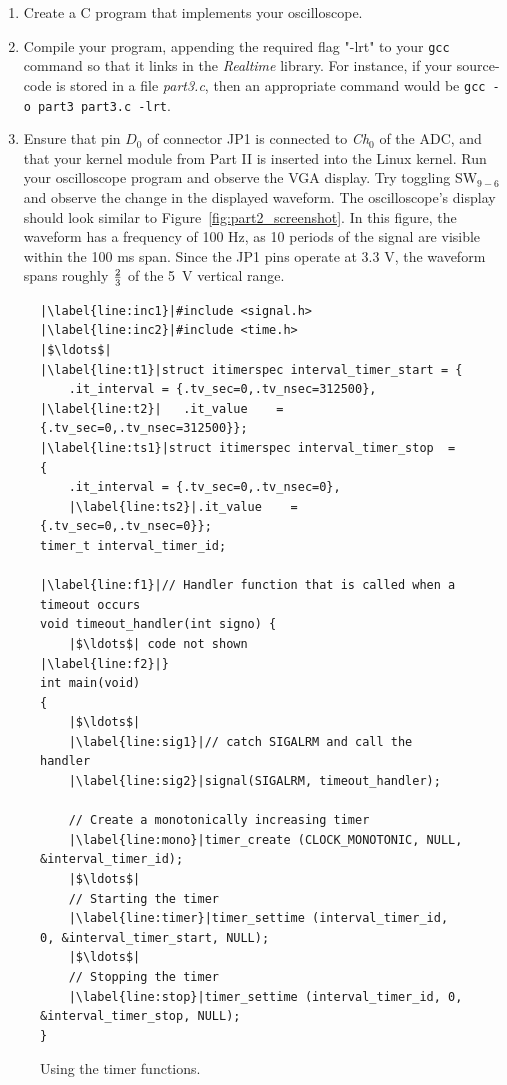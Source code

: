 \documentclass[epsfig,10pt,fullpage]{article}
\begin{document}
\begin{enumerate}
\item Create a C program that implements your oscilloscope.

\item Compile your program, appending the required flag "-lrt" to your \texttt{gcc} command 
so that it links in the \textit{Realtime} library. For instance, if your source-code is
stored in a file {\it part3.c}, then an appropriate command would be 
\texttt{gcc -o part3 part3.c -lrt}.

\item Ensure that pin $D_0$ of connector JP1 is connected to {\it Ch}$_0$ of the ADC, and that
your kernel module from Part II is inserted into the Linux kernel. Run your oscilloscope
program and observe the VGA display. Try toggling SW$_{9-6}$ and observe the change in the 
displayed waveform. The oscilloscope's display should look similar to 
Figure~\ref{fig:part2_screenshot}. In this figure, the waveform has a frequency of 100 Hz, 
as 10 periods of the signal are visible within the 100 ms span. Since the JP1 pins operate 
at 3.3 V, the waveform spans roughly $2 \over 3$ of the 5~V vertical range.
\end{enumerate}

\lstset{language=C,numbers=left,escapechar=|}
\begin{figure}[H]
\begin{center}
\begin{minipage}[t]{16 cm}
\begin{lstlisting}
|\label{line:inc1}|#include <signal.h>
|\label{line:inc2}|#include <time.h>
|$\ldots$|
|\label{line:t1}|struct itimerspec interval_timer_start = {
	.it_interval = {.tv_sec=0,.tv_nsec=312500},
|\label{line:t2}|	.it_value    = {.tv_sec=0,.tv_nsec=312500}};
|\label{line:ts1}|struct itimerspec interval_timer_stop  = {
 	.it_interval = {.tv_sec=0,.tv_nsec=0},
	|\label{line:ts2}|.it_value    = {.tv_sec=0,.tv_nsec=0}};
timer_t interval_timer_id;

|\label{line:f1}|// Handler function that is called when a timeout occurs
void timeout_handler(int signo) {
	|$\ldots$| code not shown 
|\label{line:f2}|}
int main(void)
{
	|$\ldots$| 
	|\label{line:sig1}|// catch SIGALRM and call the handler
	|\label{line:sig2}|signal(SIGALRM, timeout_handler);

	// Create a monotonically increasing timer
	|\label{line:mono}|timer_create (CLOCK_MONOTONIC, NULL, &interval_timer_id);
	|$\ldots$|
	// Starting the timer
	|\label{line:timer}|timer_settime (interval_timer_id, 0, &interval_timer_start, NULL);
	|$\ldots$|
	// Stopping the timer
	|\label{line:stop}|timer_settime (interval_timer_id, 0, &interval_timer_stop, NULL);
}
\end{lstlisting}
\end{minipage}
\end{center}
\vspace{-0.25in}\caption{Using the timer functions.}
\label{fig:timer_code}
\end{figure}
\end{document}
